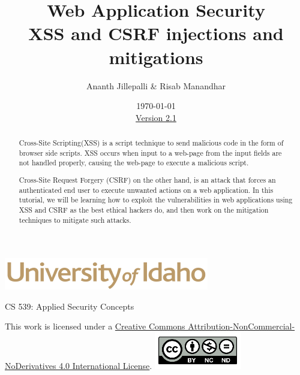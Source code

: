 \documentclass[12pt]{extarticle}
\begin{document}
\title{ Web Application Security\\XSS and CSRF injections and mitigations}
\author{Ananth Jillepalli \& Risab Manandhar}
\date{\today \\ \hyperref[changelog]{Version 2.1}}
\renewcommand{\abstractname}{Summary}
\begin{titlepage}
\maketitle
{}
\begin{center}
\includegraphics[scale=.5]{UofI}

\large{CS 539: Applied Security Concepts}

\vskip 40pt

\end{center}
\begin{abstract}
Cross-Site Scripting(XSS) is a script technique to send malicious code in the form of browser side scripts. XSS occurs when input to a web-page from the input fields are not handled properly, causing the web-page to execute a malicious script.

\vspace{4mm}
\noindent
Cross-Site Request Forgery (CSRF) on the other hand, is an attack that forces an authenticated end user to execute unwanted actions on a web application. In this tutorial, we will be learning how to exploit the vulnerabilities in web applications using XSS and CSRF as the best ethical hackers do, and then work on the mitigation techniques to mitigate such attacks.
\end{abstract}


\vfill
\begin{center}
This work is licensed under a \href{https://creativecommons.org/licenses/by-nc-nd/2.0/}{Creative Commons Attribution-NonCommercial-NoDerivatives 4.0 International License}.
\vskip 10pt
\includegraphics[scale=.5]{cc}
\end{center}

\end{titlepage}
\end{document}
